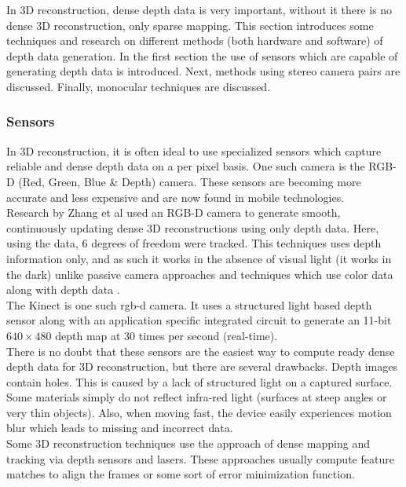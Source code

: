 
In 3D reconstruction, dense depth data is very important, without it there is no dense 3D reconstruction, only sparse mapping. This section introduces some techniques and research on different methods (both hardware and software) of depth data generation. In the first section the use of sensors which are capable of generating depth data is introduced. Next, methods using stereo camera pairs are discussed. Finally, monocular techniques are discussed. \\


\subsubsection{Sensors}

In 3D reconstruction, it is often ideal to use specialized sensors which capture reliable and dense depth data on a per pixel basis. One such camera is the RGB-D (Red, Green, Blue \& Depth) camera. These sensors are becoming more accurate and less expensive and are now found in mobile technologies. \\

Research by Zhang et al \cite{Zhang12Microsoft} used an RGB-D camera to generate smooth, continuously updating dense 3D reconstructions using only depth data. Here, using the data, 6 degrees of freedom were tracked. This techniques uses depth information only, and as such it works in the absence of visual light (it works in the dark) unlike passive camera approaches \cite{Klein07Parallel, Newcombe10Live,Stuhmer10Real} and techniques which use color data along with depth data \cite{Henry10Rgb}. \\

The Kinect is one such rgb-d camera. It uses a structured light based depth sensor along with an application specific integrated circuit to generate an 11-bit $640\times 480$ depth map at 30 times per second (real-time). \\

There is no doubt that these sensors are the easiest way to compute ready dense depth data for 3D reconstruction, but there are several drawbacks. Depth images contain holes. This is caused by a lack of structured light on a captured surface. Some materials simply do not reflect infra-red light (surfaces at steep angles or very thin objects). Also, when moving fast, the device easily experiences motion blur which leads to missing and incorrect data. \\

Some 3D reconstruction techniques use the approach of dense mapping and tracking via depth sensors and lasers. These approaches usually compute feature matches to align the frames or some sort of error minimization function.


